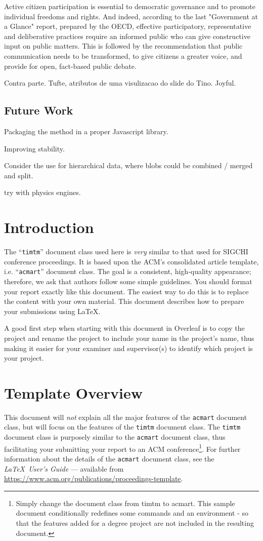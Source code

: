 \documentclass[manuscript, screen]{timtm}
\begin{document}
Active citizen participation is essential to democratic governance and to promote individual freedoms and rights. And indeed, according to the last "Government at a Glance" report, prepared by the OECD, effective participatory, representative and deliberative practices require an informed public who can give constructive input on public matters. This is followed by the recommendation that public communication needs to be transformed, to give citizens a greater voice, and provide for open, fact-based public debate.

Contra parte. Tufte, atributos de uma visulizacao do slide do Tino. Joyful.

\subsection{Future Work}

Packaging the method in a proper Javascript library.

Improving stability.

Consider the use for hierarchical data, where blobs could be combined / merged and split.

try with physics engines.

\section{Introduction}
The ``\verb|timtm|'' document class used here is \emph{very} similar to that used for SIGCHI
conference proceedings. It is based upon the ACM's consolidated article template, i.e. ``\verb|acmart|'' document class.
The goal is a consistent, high-quality appearance; therefore, we ask that authors follow some
simple guidelines. You should format your report exactly like this
document. The easiest way to do this is to replace the content with
your own material.  This document describes how to prepare your
submissions using \LaTeX\@.

A good first step when starting with this document in Overleaf is to copy the project and rename the project to include your name in the project's name, thus making it easier for your examiner and supervisor(s) to identify which project is your project.

\section{Template Overview}

This document will \emph{not} explain all the major features of the \verb|acmart| document
class, but will focus on the features of the \verb|timtm| document
class. The \verb|timtm| document
class is purposely similar to the \verb|acmart| document
class, thus facilitating your submitting your report to an ACM conference\footnote{Simply change the document class from timtm to acmart. This sample document conditionally redefines some commands and an environment - so that the features added for a degree project are not included in the resulting document.}. For further information about the details of the \verb|acmart| document
class, see the {\itshape \LaTeX\ User's Guide} --- 
available from \url{https://www.acm.org/publications/proceedings-template}.
\end{document}
